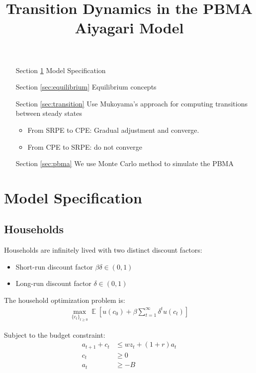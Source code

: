 \documentclass[11pt,a4paper]{article}
\title{\vspace{-1.5cm}\LARGE\textbf{Transition Dynamics in the PBMA Aiyagari Model}}
\DeclareMathOperator{\E}{\mathbb{E}}
\begin{document}
\maketitle

\noindent
\begin{enumerate}
    \item[Section \ref{sec:model}] Model Specification
    \item[Section \ref{sec:equilibrium}] Equilibrium concepts
    \item[Section \ref{sec:transition}]Use Mukoyama's approach for computing transitions between steady states
    \begin{itemize}
        \item From SRPE to CPE: Gradual adjustment and converge.
        \item From CPE to SRPE: do not converge
    \end{itemize}
    \item[Section \ref{sec:pbma}] We use Monte Carlo method to simulate the PBMA
\end{enumerate}

\section{Model Specification}\label{sec:model}

\subsection{Households}

Households are infinitely lived with two distinct discount factors:
\begin{itemize}
    \item Short-run discount factor $\beta\delta \in (0,1)$
    \item Long-run discount factor $\delta \in (0,1)$
\end{itemize}

\noindent The household optimization problem is:
\begin{align}
\max_{\{c_t\}_{t\geq 0}} \E\left[u(c_0) + \beta \sum_{t=1}^{\infty} \delta^t u(c_t)\right]
\end{align}

\noindent Subject to the budget constraint:
\begin{align}
a_{t+1} + c_t &\leq wz_t + (1 + r)a_t\\
c_t &\geq 0\\
a_t &\geq -B
\end{align}
\end{document}
